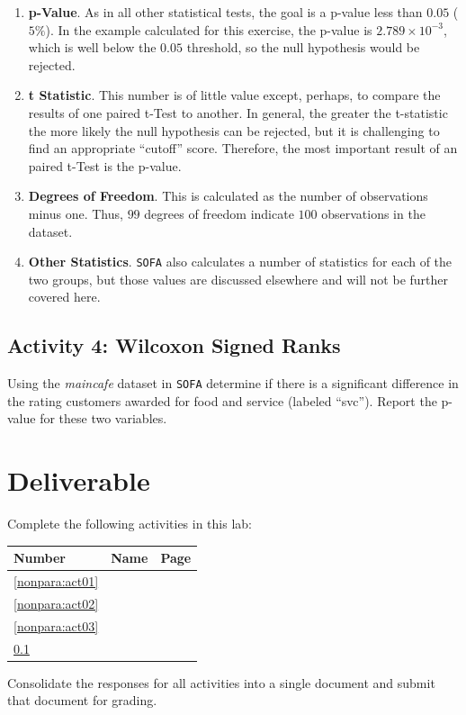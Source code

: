 \begin{enumerate}
  \item \textbf{p-Value}. As in all other statistical tests, the goal is a p-value less than $ 0.05 $ ($ 5\% $). In the example calculated for this exercise, the p-value is $ 2.789\times10^{-3} $, which is well below the $ 0.05 $ threshold, so the null hypothesis would be rejected.
  \item \textbf{t Statistic}. This number is of little value except, perhaps, to compare the results of one paired t-Test to another. In general, the greater the t-statistic the more likely the null hypothesis can be rejected, but it is challenging to find an appropriate ``cutoff'' score. Therefore, the most important result of an paired t-Test is the p-value.
  \item \textbf{Degrees of Freedom}. This is calculated as the number of observations minus one. Thus, $ 99 $ degrees of freedom indicate $ 100 $ observations in the dataset.
  \item \textbf{Other Statistics}. \texttt{SOFA} also calculates a number of statistics for each of the two groups, but those values are discussed elsewhere and will not be further covered here.
  
\end{enumerate}

\subsection{Activity 4: Wilcoxon Signed Ranks} \label{nonpara:act04}

Using the \textit{maincafe} dataset in \texttt{SOFA} determine if there is a significant difference in the rating customers awarded for food and service (labeled ``svc''). Report the p-value for these two variables.

\section{Deliverable}

Complete the following activities in this lab:

\begin{center}
  \begin{tabular}{lll}
    \hline 
    \textbf{Number} & \textbf{Name} & \textbf{Page} \\ 
    \hline 
    \ref{nonpara:act01} & \nameref{nonpara:act01} & \pageref{nonpara:act01} \\ 
    \ref{nonpara:act02} & \nameref{nonpara:act02} & \pageref{nonpara:act02} \\ 
    \ref{nonpara:act03} & \nameref{nonpara:act03} & \pageref{nonpara:act03} \\ 
    \ref{nonpara:act04} & \nameref{nonpara:act04} & \pageref{nonpara:act04} \\ 
    \hline 
  \end{tabular} 
\end{center}

Consolidate the responses for all activities into a single document and submit that document for grading.



